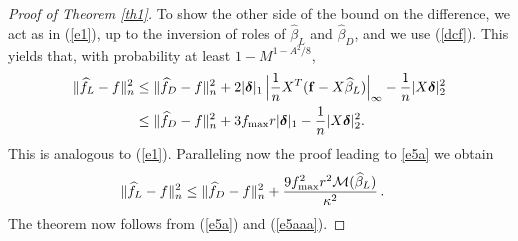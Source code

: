 \documentclass[dvips,aos]{imsart}
\numberwithin{equation}{section}
\theoremstyle{plain}
\def\wideth{\widehat}
\def\scm{{\cal M}}
\def\wh{\widehat}
\newcommand{\bD}{\mbox{\boldmath$\delta$}}
\begin{document}
\begin{proof}[Proof of Theorem \ref{th1}]
To show the other side of the bound on the difference, we act as in (\ref{e1}), up to the inversion of
roles of $\wh\beta_L$ and $\wh\beta_D$, and we use (\ref{dcf}).
This yields that, with probability at least $1-M^{1-A^2/8}$,
\begin{equation}\label{e5}
\begin{split}
\| \wideth f_L -f\|_n^2 &\le \| \wideth{f}_D -f \|_n^2 +
2|\bD|_1 \, \Big|\frac{1}{n}X^T({\bf f}-X\wh \beta_L)\Big|_\infty
- \frac{1}{n}|X \bD|^2_2\\
%
 &\le \| \wideth{f}_D -f \|_n^2 + 3f_{\max}r|\bD|_1 -
\frac{1}{n}|X \bD|^2_2.
\end{split}\end{equation}
This is analogous to (\ref{e1}). Paralleling now the proof leading
to \eqref{e5a} we obtain
\begin{equation}\label{e5aaa}
\begin{split}
\| \wideth f_L -f\|_n^2 &\le \| \wideth{f}_D-f \|_n^2 + \frac{9
f_{\max}^2 r^2 \scm(\wh \beta_L)}{\kappa^2}\,.
\end{split}\end{equation}
The theorem now follows from (\ref{e5a}) and (\ref{e5aaa}).
\end{proof}



\end{document}
